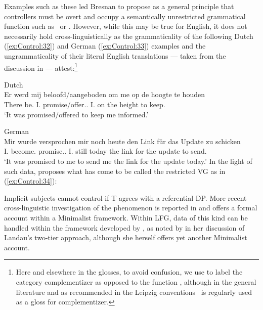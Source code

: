 \documentclass[output=paper,hidelinks]{langscibook}
\begin{document}
\ea\label{ex:Control:31}
\z\z
Examples such as these led Bresnan to propose as a general principle that controllers must be overt and occupy a semantically unrestricted grammatical function such as \SUBJ\ or \OBJ. However, while this may be true for English, it does not necessarily hold cross-linguistically as the grammaticality of the following Dutch (\ref{ex:Control:32}) and German (\ref{ex:Control:33}) examples and the ungrammaticality of their literal English translations --- taken from the discussion in \citet{Wurmbrand2021} --- attest:\footnote{Here and elsewhere in the glosses, to avoid confusion, we use  to label the category complementizer as opposed to the function \COMP, although in the general literature and as recommended in the Leipzig conventions \COMP\ is regularly used as a gloss for complementizer.}

\ea\label{ex:Control:32}Dutch\\\gll
Er  werd  mij  beloofd/aangeboden  om me  op  de  hoogte  te houden\\
 There  {be.\PST} {I.\DAT}  {promise/offer.\PST.\PTCP}   {I.\DAT}  on  the  height to {keep.\INF}\\
\glt `It was promised/offered to keep me informed.'
 \z
 
\ea\label{ex:Control:33}German\\\gll
Mir wurde   versprochen  mir  noch heute  den Link f{\"u}r  das  Update zu  schicken\\
{I.\DAT}  {become.\PST}  {promise.\PST.\PTCP} {I.\DAT}  still today  the link for  the update to  {send.\INF}\\
\glt`It was promised to me to send me the link for the update today.'
\z
In the light of such data, \citet{vanUrk2013} proposes what has come to be called \citep[182]{Landau2013} the restricted VG as in (\ref{ex:Control:34}):

\ea\label{ex:Control:34}
Implicit subjects cannot control if T agrees with a referential DP.
\z
More recent cross-linguistic investigation of the phenomenon is reported in \citet{PitteroffSchafer2019} and \citet{Wurmbrand2021} offers a formal account within a Minimalist framework. Within LFG, data of this kind can be handled within the framework developed by \citet{Haug2014b}, as noted by \citet[ 13--16]{Reed2020} in her discussion of Landau's two-tier approach, although she herself offers yet another Minimalist account.
\end{document}
